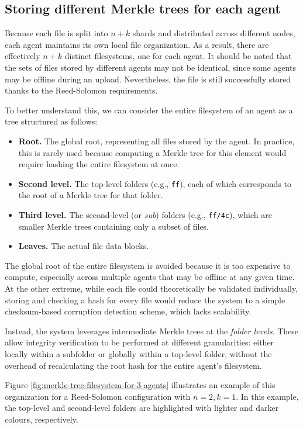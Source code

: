 \subsection{Storing different Merkle trees for each agent}

Because each file is split into $n+k$ shards and distributed across different nodes, each agent maintains its own local file organization. As a result, there are effectively $n+k$ distinct filesystems, one for each agent. It should be noted that the sets of files stored by different agents may not be identical, since some agents may be offline during an upload. Nevertheless, the file is still successfully stored thanks to the Reed-Solomon requirements.

To better understand this, we can consider the entire filesystem of an agent as a tree structured as follows:
\begin{itemize}
    \item \textbf{Root.} The global root, representing all files stored by the agent. In practice, this is rarely used because computing a Merkle tree for this element would require hashing the entire filesystem at once.
    \item \textbf{Second level.} The top-level folders (e.g., \texttt{ff}), each of which corresponds to the root of a Merkle tree for that folder.
    \item \textbf{Third level.} The second-level (or \emph{sub}) folders (e.g., \texttt{ff/4c}), which are smaller Merkle trees containing only a subset of files.
    \item \textbf{Leaves.} The actual file data blocks.
\end{itemize}

The global root of the entire filesystem is avoided because it is too expensive to compute, especially across multiple agents that may be offline at any given time. At the other extreme, while each file could theoretically be validated individually, storing and checking a hash for every file would reduce the system to a simple checksum-based corruption detection scheme, which lacks scalability.  

Instead, the system leverages intermediate Merkle trees at the \emph{folder levels}. These allow integrity verification to be performed at different granularities: either locally within a subfolder or globally within a top-level folder, without the overhead of recalculating the root hash for the entire agent's filesystem.

Figure \ref{fig:merkle-tree-filesystem-for-3-agents} illustrates an example of this organization for a Reed-Solomon configuration with $n=2, k=1$. In this example, the top-level and second-level folders are highlighted with lighter and darker colours, respectively.

